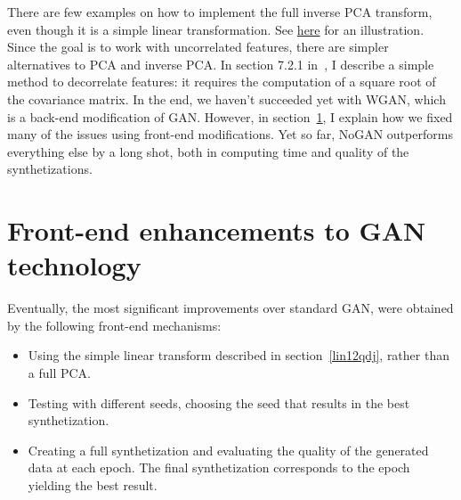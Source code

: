 \documentclass[oneside,10pt]{book}
\begin{document}
There are few examples on how to implement the full inverse PCA transform, even though it is a simple linear transformation. See
 \href{https://stats.stackexchange.com/questions/229092/how-to-reverse-pca-and-reconstruct-original-variables-from-several-principal-com}{here} for
 an illustration.  Since the goal is to work with uncorrelated features, there are simpler alternatives to PCA and inverse PCA. In section
 7.2.1 in~\cite{vgelsevier}, I describe a simple method to decorrelate features: it requires the computation of a square root of the
 covariance matrix. In the end, we haven't succeeded yet with WGAN, which is a back-end modification of GAN. However, in section~\ref{ou6xkj},
 I explain how we fixed many of the issues using front-end modifications. Yet so far, NoGAN outperforms everything else by a long shot,
 both in computing time and quality of the synthetizations.

\section{Front-end enhancements to GAN technology}\label{ou6xkj}

Eventually, the most significant improvements over standard GAN, were obtained by the following front-end mechanisms: \vspace{1ex}

\begin{itemize}
\item Using the simple linear transform described in section~\ref{lin12qdj}, rather than a full PCA.
\item Testing with different seeds, choosing the seed that results in the best synthetization.
\item Creating a full synthetization and evaluating the quality of the generated data at each epoch.
 The final synthetization corresponds to the epoch yielding the best result.
\end{itemize}\vspace{1ex}
\end{document}
